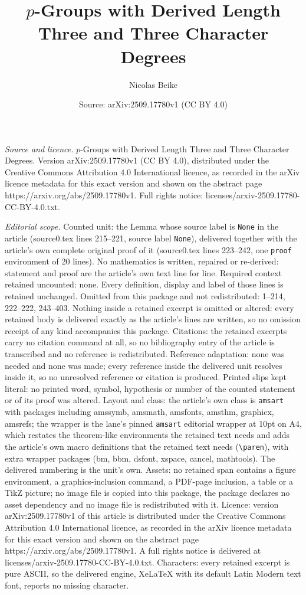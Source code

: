 \documentclass[10pt,a4paper]{amsart}
\title[$p$-Groups with Derived Length Three and Three Character Deg]{$p$-Groups with Derived Length Three and Three Character Degrees}
\author{Nicolas Beike}
\date{Source: arXiv:2509.17780v1 (CC BY 4.0)}
\begin{document}
\maketitle

\noindent\emph{Source and licence.} $p$-Groups with Derived Length Three and Three Character Degrees. Version arXiv:2509.17780v1 (CC BY 4.0), distributed under the Creative Commons Attribution 4.0 International licence, as recorded in the arXiv licence metadata for this exact version and shown on the abstract page https://arxiv.org/abs/2509.17780v1. Full rights notice: licenses/arxiv-2509.17780-CC-BY-4.0.txt.\par\smallskip

\noindent\textit{Editorial scope.} Counted unit: the Lemma whose source label is \texttt{None} in the article (source0.tex lines 215--221, source label \texttt{None}), delivered together with the article's own complete original proof of it (source0.tex lines 223--242, one \texttt{proof} environment of 20 lines). No mathematics is written, repaired or re-derived: statement and proof are the article's own text line for line. Required context retained uncounted: none. Every definition, display and label of those lines is retained unchanged. Omitted from this package and not redistributed: 1--214, 222--222, 243--403. Nothing inside a retained excerpt is omitted or altered: every retained body is delivered exactly as the article's lines are written, so no omission receipt of any kind accompanies this package. Citations: the retained excerpts carry no citation command at all, so no bibliography entry of the article is transcribed and no reference is redistributed. Reference adaptation: none was needed and none was made; every reference inside the delivered unit resolves inside it, so no unresolved reference or citation is produced. Printed slips kept literal: no printed word, symbol, hypothesis or number of the counted statement or of its proof was altered. Layout and class: the article's own class is \texttt{amsart} with packages including amssymb, amsmath, amsfonts, amsthm, graphicx, amsrefs; the wrapper is the lane's pinned \texttt{amsart} editorial wrapper at 10pt on A4, which restates the theorem-like environments the retained text needs and adds the article's own macro definitions that the retained text needs (\texttt{\textbackslash paren}), with extra wrapper packages (bm, bbm, dsfont, xspace, cancel, mathtools). The delivered numbering is the unit's own. Assets: no retained span contains a figure environment, a graphics-inclusion command, a PDF-page inclusion, a table or a TikZ picture; no image file is copied into this package, the package declares no asset dependency and no image file is redistributed with it. Licence: version arXiv:2509.17780v1 of this article is distributed under the Creative Commons Attribution 4.0 International licence, as recorded in the arXiv licence metadata for this exact version and shown on the abstract page https://arxiv.org/abs/2509.17780v1. A full rights notice is delivered at licenses/arxiv-2509.17780-CC-BY-4.0.txt. Characters: every retained excerpt is pure ASCII, so the delivered engine, XeLaTeX with its default Latin Modern text font, reports no missing character.
\end{document}
